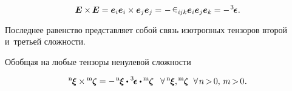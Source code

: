 \begin{otherlanguage}{russian}
%
%
\vspace{-0.32em}\begin{equation}\label{iso:twothree}
\bm{E} \times \hspace{-0.16ex} \bm{E} = \bm{e}_i \bm{e}_i \times \bm{e}_j \bm{e}_j = \hspace{-0.4ex} \tikzmark{BeginECrossE} - \hspace{-0.2ex} \levicivita_{i\hspace{-0.1ex}jk} \bm{e}_i \bm{e}_j \bm{e}_k \tikzmark{EndECrossE} = - \hspace{.2ex} \levicivitatensor \hspace{0.1ex}.
\end{equation}
%

\vspace{-0.5em} \noindent Последнее равенство представляет собой связь изотропных тензоров второй и~третьей сложности.

Обобщая на любые тензоры ненулевой сложности

\nopagebreak\vspace{-0.25em}\begin{equation}\label{crossproductforanytwotensors}
{^\mathrm{n}\hspace{-0.12ex}\bm{\xi}} \times \hspace{-0.12ex} {^\mathrm{m}\hspace{-0.12ex}\bm{\zeta}}
=
- \hspace{.25ex} {^\mathrm{n}\hspace{-0.12ex}\bm{\xi}} \dotp \levicivitatensor \dotp \hspace{-0.1ex} {^\mathrm{m}\hspace{-0.12ex}\bm{\zeta}}
\;\;\:
%
\forall \hspace{.4ex} {^\mathrm{n}\hspace{-0.12ex}\bm{\xi}} ,
\hspace{-0.12ex} {^\mathrm{m}\hspace{-0.12ex}\bm{\zeta}}
\;\;
\forall \hspace{.25ex} n \hspace{-0.25ex} > \hspace{-0.25ex} 0 , \,
m \hspace{-0.25ex} > \hspace{-0.25ex} 0
\hspace{.1ex} .
\end{equation}


\end{otherlanguage}
